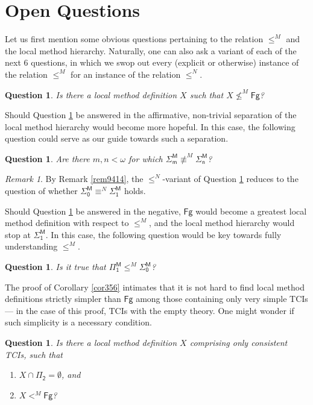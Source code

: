 \documentclass[12pt, twoside]{memoir}
\numberwithin{equation}{section}
\newtheorem{ques}[thm]{Question}
\theoremstyle{definition}
\theoremstyle{remark}
\newtheorem{rem}[thm]{Remark}
\theoremstyle{definition}
\theoremstyle{definition}
\theoremstyle{definition}
\theoremstyle{remark}
\begin{document}
\section{Open Questions}

Let us first mention some obvious questions pertaining to the relation $\leq^M$ and the local method hierarchy. Naturally, one can also ask a variant of each of the next 6 questions, in which we swop out every (explicit or otherwise) instance of the relation $\leq^M$ for an instance of the relation $\leq^N$.

\begin{ques}\label{q843}
Is there a local method definition $X$ such that $X \not\leq^M \mathsf{Fg}$?
\end{ques}

Should Question \ref{q843} be answered in the affirmative, non-trivial separation of the local method hierarchy would become more hopeful. In this case, the following question could serve as our guide towards such a separation.

\begin{ques}\label{q841}
Are there $m, n < \omega$ for which $\mathsf{\Sigma^M_m} \not\equiv^M \mathsf{\Sigma^M_n}$?
\end{ques}

\begin{rem}
By Remark \ref{rem9414}, the $\leq^N$-variant of Question \ref{q841} reduces to the question of whether $\mathsf{\Sigma^M_0} \equiv^N \mathsf{\Sigma^M_1}$ holds.
\end{rem}

Should Question \ref{q843} be answered in the negative, $\mathsf{Fg}$ would become a greatest local method definition with respect to $\leq^M$, and the local method hierarchy would stop at $\mathsf{\Sigma^M_1}$. In this case, the following question would be key towards fully understanding $\leq^M$.

\begin{ques}\label{q842}
Is it true that $\mathsf{\Pi^M_1} \leq^M \mathsf{\Sigma^M_0}$?
\end{ques}

The proof of Corollary \ref{cor356} intimates that it is not hard to find local method definitions strictly simpler than $\mathsf{Fg}$ among those containing only very simple TCIs --- in the case of this proof, TCIs with the empty theory. One might wonder if such simplicity is a necessary condition.

\begin{ques}\label{q357}
Is there a local method definition $X$ comprising only consistent TCIs, such that
\begin{enumerate}[label=(\arabic*)]
    \item $X \cap \mathsf{\Pi_2} = \emptyset$, and
    \item $X <^M \mathsf{Fg}$?
\end{enumerate}
\end{ques}
\end{document}
